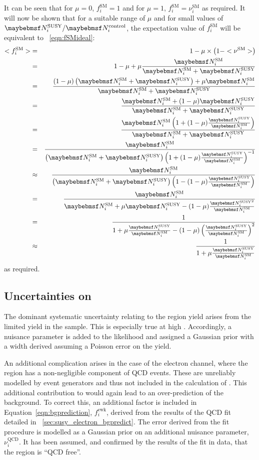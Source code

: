 It can be seen that for $\mu=0$, $f^{\textrm{SM}}_i=1$ and for $\mu=1$,
$f^{\textrm{SM}}_i=\nu^{\textrm{SM}}_i$ as required. It will now be shown that
for a suitable range of $\mu$ and for small values of $\NSUSYi/\NControli$, the
expectation value of $f^{\textrm{SM}}_i$ will be equivalent to
\eqn~\ref{eqn:fSMideal}:
\begin{eqnarray*}
  <f^{\textrm{SM}}_i> &=& 1 - \mu \times \left(1-<\nu^{\textrm{SM}}>\right) \\
  &=& 1 - \mu  + \mu\frac{\NSMi}{\NSMi + \NSUSYi} \\
  &=& \frac{(1-\mu)\left(\NSMi + \NSUSYi\right) + \mu\NSMi}{\NSMi + \NSUSYi} \\
  &=& \frac{\NSMi + (1 - \mu)\NSUSYi}{\NSMi + \NSUSYi} \\
  &=& \frac{\NSMi \left( 1 + (1-\mu)\frac{\NSUSYi}{\NSMi}\right)}{\NSMi + \NSUSYi} \\
  &=& \frac{\NSMi}{\left(\NSMi +\NSUSYi\right)\left( 1 + (1 - \mu)\frac{\NSUSYi}{\NSMi}\right)^{-1}} \\
  &\approx& \frac{\NSMi}{\left(\NSMi +\NSUSYi\right)\left( 1 - (1-\mu)\frac{\NSUSYi}{\NSMi}\right)} \\
  &=& \frac{\NSMi}{\NSMi + \mu\NSUSYi - (1-\mu)\frac{\NSUSYi^2}{\NSMi}}\\
  &=& \frac{1}{1 + \mu\frac{\NSUSYi}{\NSMi} - (1-\mu)\left(\frac{\NSUSYi}{\NSMi}\right)^2} \\
  &\approx& \frac{1}{1 + \mu\frac{\NSUSYi}{\NSMi}}
\end{eqnarray*}
as required.

\subsection[Uncertainties on \texorpdfstring{\NControli}{NControli}]{Uncertainties on \boldmath{\NControli}}
The dominant systematic uncertainty relating to the \LPcontrol region yield
arises from the limited yield in the sample. This is especially true at
high \STlep. Accordingly, a nuisance parameter is added to the likelihood and
assigned a Gaussian prior with a width derived assuming a Poisson error on the
\NControli yield.

An additional complication arises in the case of the electron channel, where the
\LPcontrol region has a non-negligible component of \ac{QCD} events. These are
unreliably modelled by event generators and thus not included in the calculation
of \RCSi. This additional contribution to \NControli would again lead to an
over-prediction of the background. To correct this, an additional factor is
included in Equation~\ref{eqn:bgprediction}, $f^{\textrm{ewk}}_i$, derived from
the results of the \ac{QCD} fit detailed in
\sec~\ref{sec:susy_electron_bgpredict}. The error derived from the fit procedure
is modelled as a Gaussian prior on an additional nuisance parameter,
$\nu^{\textrm{QCD}}_i$. It has been assumed, and confirmed by the results of the
fit in data, that the region \LPsignal is ``\ac{QCD} free''.

